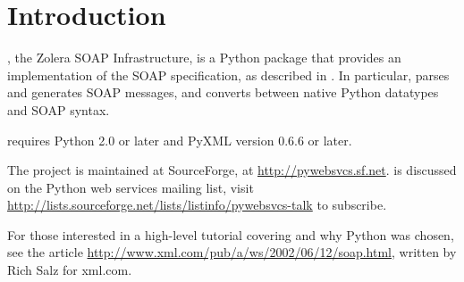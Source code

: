 \chapter{Introduction}

\ZSI{}, the Zolera SOAP Infrastructure, is a Python package that
provides an implementation of the SOAP specification, as described in
.
In particular, \ZSI{} parses and generates SOAP messages, and
converts between native Python datatypes and SOAP syntax.

 requires Python 2.0 or later and PyXML version 0.6.6 or later.

The  project is maintained at SourceForge, at
\url{http://pywebsvcs.sf.net}.
\ZSI{} is discussed on the Python web services mailing list, visit
\url{http://lists.sourceforge.net/lists/listinfo/pywebsvcs-talk}
to subscribe.

For those interested in a high-level tutorial covering \ZSI{} and why
Python was chosen, see the article
\url{http://www.xml.com/pub/a/ws/2002/06/12/soap.html}, 
written by Rich Salz for xml.com.

